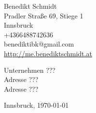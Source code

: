 


\begin{flushleft}
Benedikt Schmidt \\
Pradler Straße 69, Stiege 1 \\
Innsbruck \\
+4366488742636 \\
benediktibk@gmail.com \\
\url{http://me.benediktschmidt.at} \\
\end{flushleft}
\begin{flushleft}
Unternehmen ??? \\
Adresse ??? \\
Adresse ??? \\
\end{flushleft}
\begin{flushright}
Innsbruck, \today
\end{flushright}

